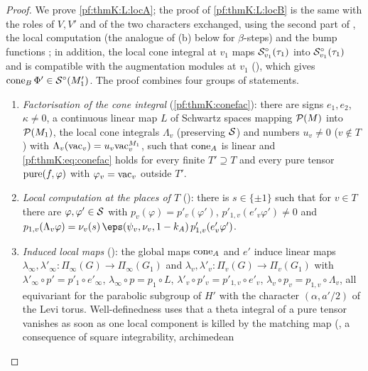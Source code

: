 \begin{proof}
We prove \ref{pf:thmK:L:locA}; the proof of \ref{pf:thmK:L:locB} is the same with the roles of $V,V'$ and of the two
characters exchanged, using the second part of , the local computation
 (the analogue of (b) below for $\beta$-steps) and the bump functions
; in addition, the local cone integral at $v_1$ maps
$\mathcal{S}^{\circ}_{v_1}(\tau_1)$ into $\mathcal{S}^{\circ}_{v_1}(\tau_1)$ and is compatible with the augmentation modules at $v_1$
(), which gives $\operatorname{cone}_B\Phi'\in\mathcal{S}^{\circ}(M'_1)$. The proof combines four
groups of statements.
\begin{enumerate}[label=(\alph*)]
\item \emph{Factorisation of the cone integral} (\cref{pf:thmK:conefac}): there are signs $e_1,e_2$, $\kappa\ne0$, a
continuous linear map $L$ of Schwartz spaces mapping $\mathcal{P}(M)$ into $\mathcal{P}(M_1)$, the local cone integrals $\Lambda_v$
(preserving $\mathcal{S}$) and numbers $u_v\ne0$ ($v\notin T$) with $\Lambda_v(\mathrm{vac}_v)=u_v\mathrm{vac}^{M_1}_v$, such that
$\operatorname{cone}_A$ is linear and \eqref{pf:thmK:eq:conefac} holds for every finite $T'\supseteq T$ and every pure tensor
$\operatorname{pure}(f,\varphi)$ with $\varphi_v=\mathrm{vac}_v$ outside $T'$.
\item \emph{Local computation at the places of $T$} (): there is $s\in\{\pm1\}$
such that for $v\in T$ there are $\varphi,\varphi'\in\mathcal{S}$ with $p_v(\varphi)=p'_v(\varphi')$, $p'_{1,v}(e'_v\varphi')\ne0$
and $p_{1,v}(\Lambda_v\varphi)=\nu_v(s)\,\eps(\psi_v,\nu_v,1-k_A)\,p'_{1,v}(e'_v\varphi')$.
\item \emph{Induced local maps} (): the global maps $\operatorname{cone}_A$ and $e'$ induce
linear maps $\lambda_\infty,\lambda'_\infty\colon\Pi_\infty(G)\to\Pi_\infty(G_1)$ and $\lambda_v,\lambda'_v\colon\Pi_v(G)\to
\Pi_v(G_1)$ with $\lambda'_\infty\circ p'=p'_1\circ e'_\infty$, $\lambda_\infty\circ p=p_1\circ L$,
$\lambda'_v\circ p'_v=p'_{1,v}\circ e'_v$, $\lambda_v\circ p_v=p_{1,v}\circ\Lambda_v$, all equivariant for the parabolic
subgroup of $H'$ with the character $(\alpha,a'/2)$ of the Levi torus. Well-definedness uses that a theta integral of a pure
tensor vanishes as soon as one local component is killed by the matching map
(, a consequence of square integrability, archimedean

\end{enumerate}
\end{proof}
